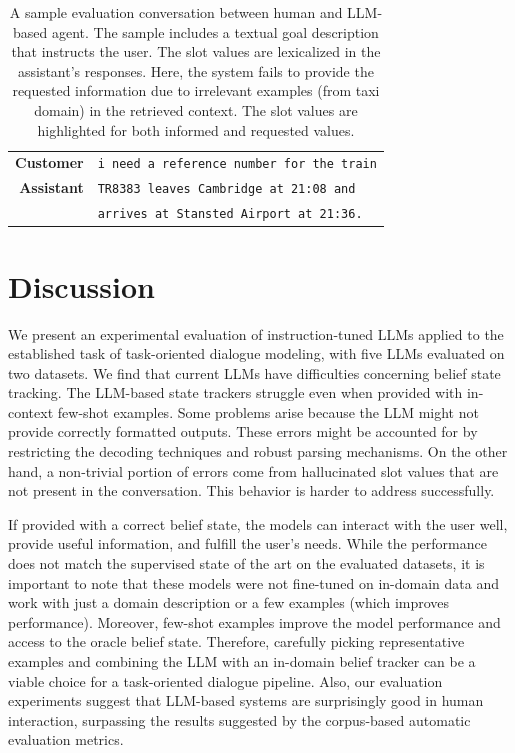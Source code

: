 \begin{table}[tp]
\begin{tabular}{r|l}
         \textbf{Customer} & \texttt{i need a {\color{orange!50!yellow!90!black!100!}reference number} for the train} \\
         \textbf{Assistant} & \texttt{{\color{red!100!yellow!90!black!100!}TR8383 leaves Cambridge at 21:08 and}} \\
         & \texttt{{\color{red!100!yellow!90!black!100!}arrives at Stansted Airport at 21:36}.}\\
         \bottomrule
    \end{tabular}
    \caption{A sample evaluation conversation between human and LLM-based agent. The sample includes a textual goal description that instructs the user. The slot values are lexicalized in the assistant's responses. Here, the system {\color{red!100!yellow!90!black!100!} fails} to provide the requested information due to irrelevant examples (from taxi domain) in the retrieved context. The slot values are highlighted for both {\color{cyan!80!yellow!80!black!100 }informed} and {\color{orange!50!yellow!90!black!100!}requested} values.}
    \label{07:tab:human-2}
\end{table}
\section{Discussion}

We present an experimental evaluation of instruction-tuned LLMs applied to the established task of task-oriented dialogue modeling, with five LLMs evaluated on two datasets.
We find that current LLMs have difficulties concerning belief state tracking.
The LLM-based state trackers struggle even when provided with in-context few-shot examples.
Some problems arise because the LLM might not provide correctly formatted outputs.
These errors might be accounted for by restricting the decoding techniques and robust parsing mechanisms.
On the other hand, a non-trivial portion of errors come from hallucinated slot values that are not present in the conversation.
This behavior is harder to address successfully.

If provided with a correct belief state, the models can interact with the user well, provide useful information, and fulfill the user's needs.
While the performance does not match the supervised state of the art on the evaluated datasets, it is important to note that these models were not fine-tuned on in-domain data and work with just a domain description or a few examples (which improves performance). 
Moreover, few-shot examples improve the model performance and access to the oracle belief state.
Therefore, carefully picking representative examples and combining the LLM with an in-domain belief tracker can be a viable choice for a task-oriented dialogue pipeline.
Also, our evaluation experiments suggest that LLM-based systems are surprisingly good in human interaction, surpassing the results suggested by the corpus-based automatic evaluation metrics.
